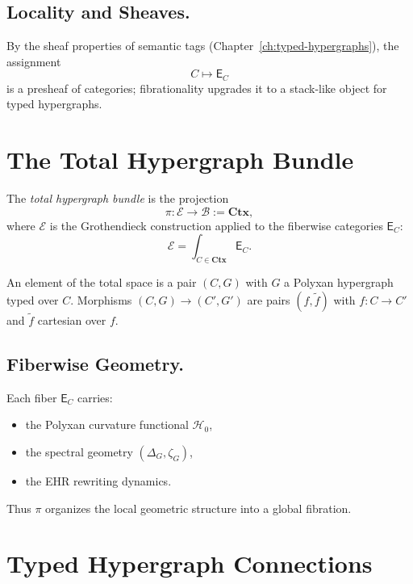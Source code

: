 \subsection*{Locality and Sheaves.}
By the sheaf properties of semantic tags (Chapter~\ref{ch:typed-hypergraphs}),
the assignment
\[
C \mapsto \mathsf{E}_C
\]
is a presheaf of categories; fibrationality upgrades it to a stack-like object
for typed hypergraphs.

\section{The Total Hypergraph Bundle}

\begin{definition}
The \emph{total hypergraph bundle} is the projection
\[
\pi : \mathcal{E} \longrightarrow \mathcal{B} := \mathbf{Ctx},
\]
where $\mathcal{E}$ is the Grothendieck construction applied to the
fiberwise categories $\mathsf{E}_C$:
\[
\mathcal{E}
= \int_{C \in \mathbf{Ctx}} \mathsf{E}_C.
\]
\end{definition}

An element of the total space is a pair $(C,G)$ with $G$ a Polyxan hypergraph
typed over $C$.  
Morphisms $(C,G)\to(C',G')$ are pairs $(f,\widetilde{f})$ with
$f : C \to C'$ and $\widetilde{f}$ cartesian over $f$.

\subsection*{Fiberwise Geometry.}
Each fiber $\mathsf{E}_C$ carries:
\begin{itemize}
\item the Polyxan curvature functional $\mathcal{H}_0$,
\item the spectral geometry $(\Delta_G, \zeta_G)$,
\item the EHR rewriting dynamics.
\end{itemize}
Thus $\pi$ organizes the local geometric structure into a global fibration.

\section{Typed Hypergraph Connections}


